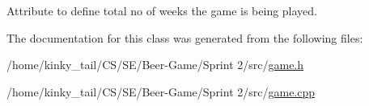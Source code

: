 Attribute to define total no of weeks the game is being played. 



The documentation for this class was generated from the following files\+:\begin{DoxyCompactItemize}
\item 
/home/kinky\+\_\+tail/\+C\+S/\+S\+E/\+Beer-\/\+Game/\+Sprint 2/src/\hyperlink{game_8h}{game.\+h}\item 
/home/kinky\+\_\+tail/\+C\+S/\+S\+E/\+Beer-\/\+Game/\+Sprint 2/src/\hyperlink{game_8cpp}{game.\+cpp}\end{DoxyCompactItemize}
